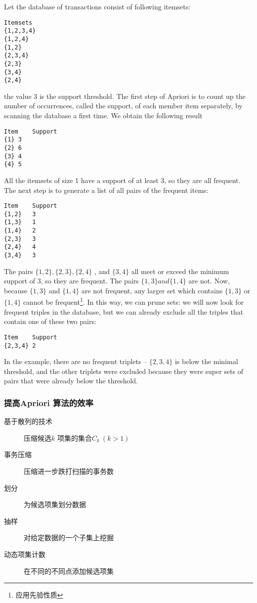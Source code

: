 \documentclass{article}
\begin{document}
\begin{example}
Let the database of transactions consist of following itemsets:
\begin{verbatim}
Itemsets
{1,2,3,4}
{1,2,4}
{1,2}
{2,3,4}
{2,3}
{3,4}
{2,4}
\end{verbatim}
the value 3 is the support threshold.
The first step of Apriori is to count up the number of occurrences, called the support, of each member item separately, by scanning the database a first time.
We obtain the following result
\begin{verbatim}
Item	Support
{1}	3
{2}	6
{3}	4
{4}	5
\end{verbatim}
All the itemsets of size 1 have a support of at least 3, so they are all frequent.
The next step is to generate a list of all pairs of the frequent items:
\begin{verbatim}
Item	Support
{1,2}	3
{1,3}	1
{1,4}	2
{2,3}	3
{2,4}	4
{3,4}	3
\end{verbatim}
The pairs $\{1,2\}, \{2,3\}, \{2,4\}$ , and $\{3,4\}$ all meet or exceed the minimum support of $3$, so they are frequent. The pairs $\{1,3\} and \{1,4\}$ are not. Now, because $\{1,3\}$ and $\{1,4\}$ are not frequent, any larger set which contains $\{1,3\}$ or $\{1,4\}$ cannot be frequent\footnote{应用先验性质}. In this way, we can prune sets: we will now look for frequent triples in the database, but we can already exclude all the triples that contain one of these two pairs:
\begin{verbatim}
Item	Support
{2,3,4}	2
\end{verbatim}
In the example, there are no frequent triplets -- $\{2,3,4\}$ is below the minimal threshold, and the other triplets were excluded because they were super sets of pairs that were already below the threshold.
\end{example}

\subsubsection{提高Apriori 算法的效率}
\begin{description}
	\item[基于散列的技术] 压缩候选$k$ 项集的集合$C_k\ (k > 1)$
	\item[事务压缩] 压缩进一步跌打扫描的事务数
	\item[划分] 为候选项集划分数据
	\item[抽样] 对给定数据的一个子集上挖掘
	\item[动态项集计数] 在不同的不同点添加候选项集
\end{description}
\end{document}
